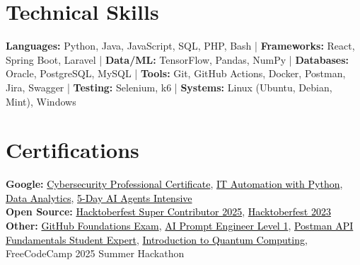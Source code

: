 \documentclass[a4paper]{article}
\begin{document}
\section{Technical Skills}
\begin{itemize}[leftmargin=0.15in, label={}]
\small{\item{
\textbf{Languages:} Python, Java, JavaScript, SQL, PHP, Bash \;|\;
\textbf{Frameworks:} React, Spring Boot, Laravel \;|\;
\textbf{Data/ML:} TensorFlow, Pandas, NumPy \;|\;
\textbf{Databases:} Oracle, PostgreSQL, MySQL \;|\;
\textbf{Tools:} Git, GitHub Actions, Docker, Postman, Jira, Swagger \;|\;
\textbf{Testing:} Selenium, k6 \;|\;
\textbf{Systems:} Linux (Ubuntu, Debian, Mint), Windows
}}
\end{itemize}


\section{Certifications}
 \begin{itemize}[leftmargin=0.15in, label={}]
    \small{\item{
    \textbf{Google:} \href{https://coursera.org/share/44fd8f381cb39ac45892569cdf6f7674}{\textcolor{black}{Cybersecurity Professional Certificate}}, \href{https://coursera.org/share/2afadc6ce043cc25337eb8c8fe61c9b6}{\textcolor{black}{IT Automation with Python}}, \href{https://coursera.org/share/24a0cddc79cd62b195fd9be6436e6dae}{\textcolor{black}{Data Analytics}}, \href{https://www.kaggle.com/certification/badges/badhon495/105}{\textcolor{black}{5-Day AI Agents Intensive}} \\
        \textbf{Open Source:} \href{https://www.holopin.io/hacktoberfest2025/userbadge/cmh9yxboc00isjl04v2tfpmt5}{\textcolor{black}{Hacktoberfest Super Contributor 2025}}, \href{https://www.holopin.io/hacktoberfest2023/hall/@badhon495}{\textcolor{black}{Hacktoberfest 2023}}\\
    \textbf{Other:} \href{https://www.credly.com/badges/d5c30c19-02db-4c5f-9bc9-4bd0f4b6a89e/public_url}{\textcolor{black}{GitHub Foundations Exam}}, \href{https://verify.certs365.io/?=3c7eb735f2aa}{\textcolor{black}{AI Prompt Engineer Level 1}}, \href{https://badges.parchment.com/public/assertions/ZF0yx-i3T1CvXYwDLEUneA?identity__email=sakib.sadman.badhon\%40g.bracu.ac.bd}{\textcolor{black}{Postman API Fundamentals Student Expert}}, \href{https://badhon495.github.io/data/QuantumCertificate.pdf}{\textcolor{black}{Introduction to Quantum Computing}}, FreeCodeCamp 2025 Summer Hackathon
    }}
 \end{itemize}


\end{document}
